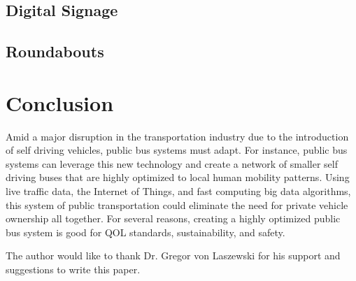 \documentclass[sigconf]{acmart}
\begin{document}
\subsection{Digital Signage}
\subsection{Roundabouts}

\section{Conclusion}

Amid a major disruption in the transportation industry due to the introduction of self driving vehicles, public bus systems must adapt. For instance, public bus systems can leverage this new technology and create a network of smaller self driving buses that are highly optimized to local human mobility patterns. Using live traffic data, the Internet of Things, and fast computing big data algorithms, this system of public transportation could eliminate the need for private vehicle ownership all together. For several reasons, creating a highly optimized public bus system is good for QOL standards, sustainability, and safety. 

\begin{acks}

The author would like to thank Dr. Gregor von Laszewski for his support and suggestions to write this paper.

\end{acks}


 


\end{document}
